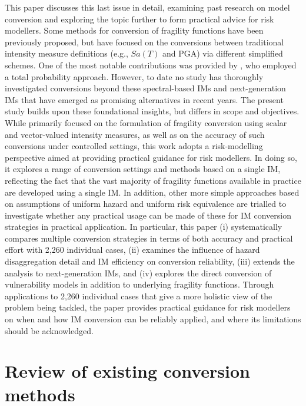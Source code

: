 This paper discusses this last issue in detail, examining past research on model conversion and exploring the topic further to form practical advice for risk modellers. Some methods for conversion of fragility functions have been previously proposed, but have focused on the conversions between traditional intensity measure definitions (e.g., $Sa(T)$ and \ac{PGA}) via different simplified schemes. One of the most notable contributions was provided by \cite{Suzuki2020}, who employed a total probability approach. However, to date no study has thoroughly investigated conversions beyond these spectral-based \acp{IM} and next-generation \acp{IM} that have emerged as promising alternatives in recent years. The present study builds upon these foundational insights, but differs in scope and objectives. While \cite{Suzuki2020} primarily focused on the formulation of fragility conversion using scalar and vector-valued intensity measures, as well as on the accuracy of such conversions under controlled settings, this work adopts a risk-modelling perspective aimed at providing practical guidance for risk modellers. In doing so, it explores a range of conversion settings and methods based on a single \ac{IM}, reflecting the fact that the vast majority of fragility functions available in practice are developed using a single \ac{IM}. In addition, other more simple approaches based on assumptions of uniform hazard and uniform risk equivalence are trialled to investigate whether any practical usage can be made of these for \ac{IM} conversion strategies in practical application. In particular, this paper (i) systematically compares multiple conversion strategies in terms of both accuracy and practical effort with 2,260 individual cases, (ii) examines the influence of hazard disaggregation detail and \ac{IM} efficiency on conversion reliability, (iii) extends the analysis to next-generation \acp{IM}, and (iv) explores the direct conversion of vulnerability models in addition to underlying fragility functions. Through applications to 2,260 individual cases that give a more holistic view of the problem being tackled, the paper provides practical guidance for risk modellers on when and how \ac{IM} conversion can be reliably applied, and where its limitations should be acknowledged.


\section{Review of existing conversion methods}\label{sec:review}

